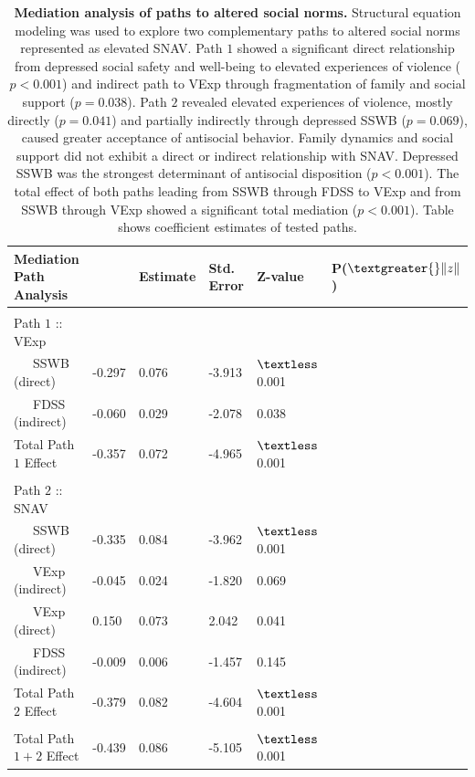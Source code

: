 \documentclass[utf8]{article}
\begin{document}
\begin{table}[h!]
\begin{tabular}{llllll}
Mediation Path Analysis &      & Estimate & Std. Error & Z-value & P($\textgreater{}\|z\|$) \\ \hline
                           &          &            &         &                          \\
Path $1$ :: VExp                       &          &            &         &                          \\
\ \ \ SSWB (direct) & -0.297   & 0.076      & -3.913  & $\textless$0.001                    \\
\ \ \ FDSS (indirect) & -0.060   & 0.029      & -2.078  & 0.038                    \\ \hline  Total Path $1$ Effect                    & -0.357   & 0.072      & -4.965  & $\textless$0.001                    \\
                           &          &            &         &                          \\
Path $2$ :: SNAV                       &          &            &         &                          \\
\ \ \ SSWB (direct) & -0.335   & 0.084      & -3.962  & $\textless$0.001                    \\ 
\ \ \ VExp (indirect) & -0.045   & 0.024      & -1.820  & 0.069                    \\
\ \ \ VExp (direct)  & 0.150    & 0.073      & 2.042   & 0.041                    \\
\ \ \ FDSS (indirect)  & -0.009   & 0.006      & -1.457  & 0.145                    \\ \hline
Total Path $2$ Effect                      & -0.379   & 0.082      & -4.604  & $\textless$0.001                    \\
                           &          &            &         &                          \\
Total Path $1+2$ Effect                     & -0.439   & 0.086      & -5.105  & $\textless$0.001                   
\end{tabular}
\caption{\textbf{Mediation analysis of paths to altered social norms.} Structural equation modeling was used to explore two complementary paths to altered social norms represented as elevated SNAV. Path $1$ showed a significant direct relationship from depressed social safety and well-being to elevated experiences of violence ($p<0.001$) and indirect path to VExp through fragmentation of family and social support ($p=0.038$). Path $2$ revealed elevated experiences of violence, mostly directly ($p=0.041$) and partially indirectly through depressed SSWB ($p=0.069$), caused greater acceptance of antisocial behavior. Family dynamics and social support did not exhibit a direct or indirect relationship with SNAV. Depressed SSWB was the strongest determinant of antisocial disposition ($p<0.001$). The total effect of both paths leading from SSWB through FDSS to VExp and from SSWB through VExp showed a significant total mediation ($p<0.001$). Table shows coefficient estimates of tested paths. \label{tab:12}}

\end{table}
\end{document}
